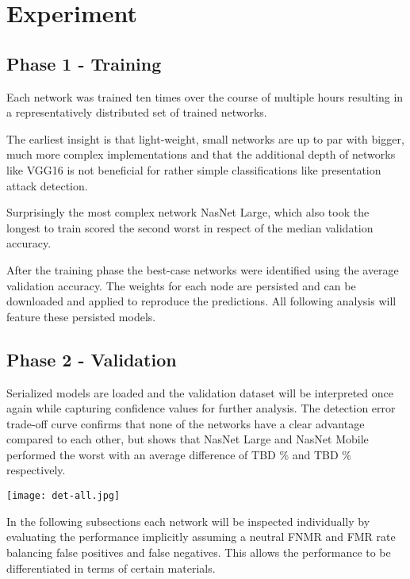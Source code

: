 
\section{Experiment}
\subsection{Phase 1 - Training}

Each network was trained ten times over the course of multiple hours resulting in a representatively distributed set of trained networks.



    

The earliest insight is that light-weight, small networks are up to par with bigger, much more complex implementations and that the additional depth of networks like VGG16 is not beneficial for rather simple classifications like presentation attack detection.

Surprisingly the most complex network NasNet Large, which also took the longest to train scored the second worst in respect of the median validation accuracy.

After the training phase the best-case networks were identified using the average validation accuracy.
The weights for each node are persisted and can be downloaded and applied to reproduce the predictions.
All following analysis will feature these persisted models.


\subsection{Phase 2 - Validation}
Serialized models are loaded and the validation dataset will be interpreted once again while capturing confidence values for further analysis.
The detection error trade-off curve confirms that none of the networks have a clear advantage compared to each other, but shows that NasNet Large and NasNet Mobile performed the worst with an average difference of TBD \% and TBD \% respectively.


\begin{minipage}{0.5\textwidth}
    
\end{minipage}%
\begin{minipage}{0.5\textwidth}
    \texttt{[image: det-all.jpg]}
\end{minipage}

In the following subsections each network will be inspected individually by evaluating the performance implicitly assuming a neutral FNMR and FMR rate balancing false positives and false negatives.
This allows the performance to be differentiated in terms of certain materials.



